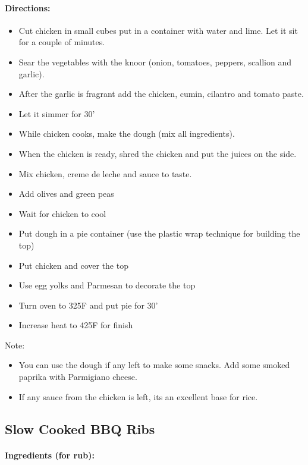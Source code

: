\documentclass{article}
\begin{document}
\paragraph{Directions:}
\begin{itemize}
	\item Cut chicken in small cubes put in a container with water and lime. Let it sit for a couple of minutes.
	\item Sear the vegetables with the knoor (onion, tomatoes, peppers, scallion and garlic).
	\item After the garlic is fragrant add the chicken, cumin, cilantro and tomato paste. 
	\item Let it simmer for 30'
	\item While chicken cooks, make the dough (mix all ingredients).
	\item When the chicken is ready, shred the chicken and put the juices on the side.
	\item Mix chicken, creme de leche and sauce to taste. 
	\item Add olives and green peas
	\item Wait for chicken to cool
	\item Put dough in a pie container (use the plastic wrap technique for building the top)
	\item Put chicken and cover the top
	\item Use egg yolks and Parmesan to decorate the top
	\item Turn oven to 325F and put pie for 30'
	\item Increase heat to 425F for finish
\end{itemize}

Note:

\begin{itemize}
\item You can use the dough if any left to make some snacks. Add some smoked paprika with Parmigiano cheese.
\item If any sauce from the chicken is left, its an excellent base for rice.
\end{itemize}

\subsection{Slow Cooked BBQ Ribs}

\paragraph{Ingredients (for rub):}
\end{document}
